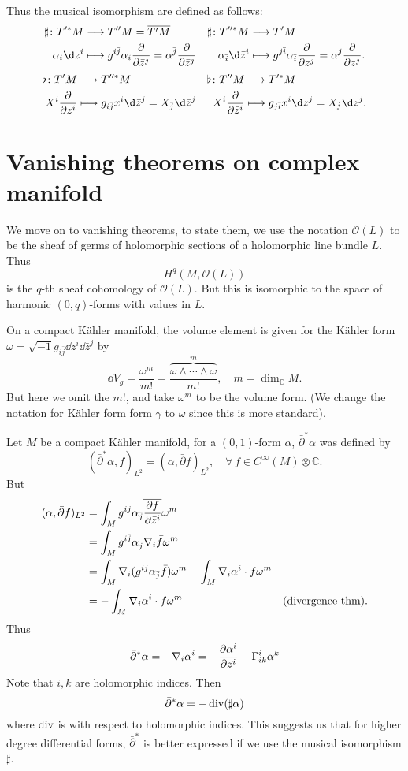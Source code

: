 \documentclass[12pt]{article}
\begin{document}
Thus the musical isomorphism are defined as follows:
\begin{align*}
  \sharp\colon T^{\prime*}M &\longrightarrow T''M=\overline{T'M}
  & \sharp\colon T^{\prime\prime*}M &\longrightarrow T'M \\
  \alpha_i \dd{z^i} &\longmapsto g^{i\bar{j}}\alpha_i \pd{\bar{z}^j}
  =\alpha^{\bar{j}}\pd{\bar{z}^j}
  &\alpha_{\bar{i}} \dd{\bar{z}^i} &\longmapsto g^{j\bar{i}}\alpha_{\bar{i}}
  \pd{z^j}=\alpha^{j}\pd{z^j}
.\end{align*}
\begin{align*}
  \flat\colon T'M &\longrightarrow T^{\prime\prime*}M
  &\flat\colon T''M &\longrightarrow T^{\prime*}M \\
  X^i\pd{z^i} &\longmapsto g_{i\bar{j}}x^i\dd{\bar{z}^j}
  =X_{\bar{j}}\dd{\bar{z}^j}
  &X^{\bar{i}}\pd{\bar{z}^i} &\longmapsto g_{j\bar{i}}x^{\bar{i}}\dd{z^j}
  =X_{j}\dd{z^j}
.\end{align*}

\section{Vanishing theorems on complex manifold}
We move on to vanishing theorems, to state them, we use the notation
\(\mathcal{O}(L)\) to be the sheaf of germs of holomorphic sections of a
holomorphic line bundle \(L\). Thus \[
  H^q(M,\mathcal{O}(L))
\] is the \(q\)-th sheaf cohomology of \(\mathcal{O}(L)\). But this is
isomorphic to the space of harmonic \((0,q)\)-forms with values in \(L\).

On a compact Kähler manifold, the volume element is given for the Kähler
form \(\omega=\sqrt{-1}g_{i\bar{j}}\dd{z^i}\dd{\bar{z}^j}\) by \[
  \dd{V_g}=\frac{\omega^m}{m!}=\frac{\overbrace{\omega\wedge\cdots\wedge\omega}
  ^m}{m!},\quad m=\dim_{\mathbb{C}}M
.\] But here we omit the \(m!\), and take \(\omega^m\) to be the volume form.
(We change the notation for Kähler form form \(\gamma\) to \(\omega\) since
this is more standard).

Let \(M\) be a compact Kähler manifold, for a \((0,1)\)-form \(\alpha\),
\(\bar{\partial}^*\alpha\) was defined by \[
  (\bar{\partial}^*\alpha,f)_{L^2}=(\alpha,\bar{\partial}f)_{L^2},
  \quad\forall\,f\in C^\infty(M)\otimes \mathbb{C}
.\] But
\begin{align*}
  (\alpha,\bar{\partial}f)_{L^2}&=\int_{M}g^{i\bar{j}}\alpha_{\bar{j}}
  \overline{\pdv{f}{\bar{z}^i}}\omega^m \\
  &=\int_{M}g^{i\bar{j}}\alpha_{\bar{j}}\nabla_i \bar{f}\omega^m \\
  &=\int_{M}\nabla_i (g^{i\bar{j}}\alpha_{\bar{j}}\bar{f})\omega^m
  -\int_{M}\nabla_i \alpha^i\cdot f\omega^m \\
  &=-\int_{M}\nabla_i \alpha^i \cdot f\omega^m & (\text{divergence thm})
.\end{align*}
Thus \[
  \bar{\partial}^*\alpha=-\nabla_i \alpha^i
  =-\pdv{\alpha^i}{z^i}-\Gamma_{ik}^i\alpha^k
\] Note that \(i,k\) are holomorphic indices. Then \[
  \bar{\partial}^*\alpha=-\operatorname{div}(\sharp\alpha)
\] where \(\operatorname{div}\) is with respect to holomorphic indices. This suggests
us that for higher degree differential forms, \(\bar{\partial}^*\) is better
expressed if we use the musical isomorphism \(\sharp\).
\end{document}
